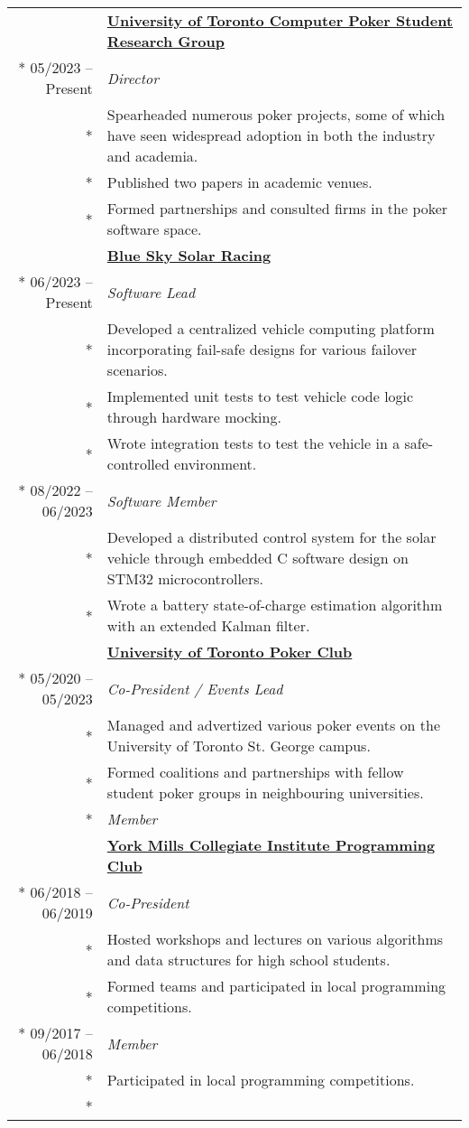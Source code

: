 \documentclass{article}
\begin{document}
	\begin{tabularx}{\textwidth}{r X}
		& \textbf{\href{https://uoftcprg.com/}{University of Toronto Computer Poker Student Research Group}} \\*
		05/2023 -- Present & \textit{Director} \\*
		& {\small Spearheaded numerous poker projects, some of which have seen widespread adoption in both the industry and academia.} \\*
		& {\small Published two papers in academic venues.} \\*
		& {\small Formed partnerships and consulted firms in the poker software space.} \\
		\addlinespace
		& \textbf{\href{https://www.blueskysolar.org/}{Blue Sky Solar Racing}} \\*
		06/2023 -- Present & \textit{Software Lead} \\*
		& {\small Developed a centralized vehicle computing platform incorporating fail-safe designs for various failover scenarios.} \\*
		& {\small Implemented unit tests to test vehicle code logic through hardware mocking.} \\*
		& {\small Wrote integration tests to test the vehicle in a safe-controlled environment.} \\*
		08/2022 -- 06/2023 & \textit{Software Member} \\*
		& {\small Developed a distributed control system for the solar vehicle through embedded C software design on STM32 microcontrollers.} \\*
		& {\small Wrote a battery state-of-charge estimation algorithm with an extended Kalman filter.} \\
		\addlinespace
		& \textbf{\href{https://uoftpoker.com/}{University of Toronto Poker Club}} \\*
		05/2020 -- 05/2023 & \textit{Co-President / Events Lead} \\*
		& {\small Managed and advertized various poker events on the University of Toronto St. George campus.} \\*
		& {\small Formed coalitions and partnerships with fellow student poker groups in neighbouring universities.} \\*
		\iftoggle{verbose}{
			09/2019 -- 05/2020 & \textit{Member} \\
			\addlinespace
			& \textbf{\href{https://schoolweb.tdsb.on.ca/yorkmillsci/Departments/Computer-Science/Clubs}{York Mills Collegiate Institute Programming Club}} \\*
			06/2018 -- 06/2019 & \textit{Co-President} \\*
			& {\small Hosted workshops and lectures on various algorithms and data structures for high school students.} \\*
			& {\small Formed teams and participated in local programming competitions.} \\*
			09/2017 -- 06/2018 & \textit{Member} \\*
			& {\small Participated in local programming competitions.} \\*
		}{}
	\end{tabularx}
\end{document}

